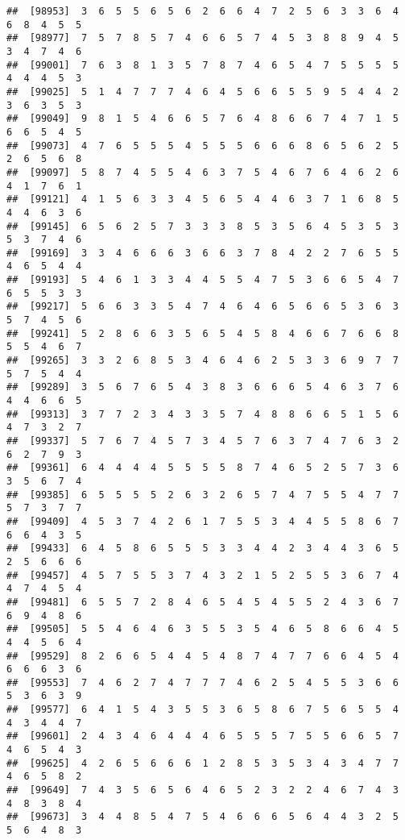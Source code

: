 \documentclass[
]{book}
\begin{document}
\begin{verbatim}
##  [98953]  3  6  5  5  6  5  6  2  6  6  4  7  2  5  6  3  3  6  4  6  8  4  5  5
##  [98977]  7  5  7  8  5  7  4  6  6  5  7  4  5  3  8  8  9  4  5  3  4  7  4  6
##  [99001]  7  6  3  8  1  3  5  7  8  7  4  6  5  4  7  5  5  5  5  4  4  4  5  3
##  [99025]  5  1  4  7  7  7  4  6  4  5  6  6  5  5  9  5  4  4  2  3  6  3  5  3
##  [99049]  9  8  1  5  4  6  6  5  7  6  4  8  6  6  7  4  7  1  5  6  6  5  4  5
##  [99073]  4  7  6  5  5  5  4  5  5  5  6  6  6  8  6  5  6  2  5  2  6  5  6  8
##  [99097]  5  8  7  4  5  5  4  6  3  7  5  4  6  7  6  4  6  2  6  4  1  7  6  1
##  [99121]  4  1  5  6  3  3  4  5  6  5  4  4  6  3  7  1  6  8  5  4  4  6  3  6
##  [99145]  6  5  6  2  5  7  3  3  3  8  5  3  5  6  4  5  3  5  3  5  3  7  4  6
##  [99169]  3  3  4  6  6  6  3  6  6  3  7  8  4  2  2  7  6  5  5  4  6  5  4  4
##  [99193]  5  4  6  1  3  3  4  4  5  5  4  7  5  3  6  6  5  4  7  6  5  5  3  3
##  [99217]  5  6  6  3  3  5  4  7  4  6  4  6  5  6  6  5  3  6  3  5  7  4  5  6
##  [99241]  5  2  8  6  6  3  5  6  5  4  5  8  4  6  6  7  6  6  8  5  5  4  6  7
##  [99265]  3  3  2  6  8  5  3  4  6  4  6  2  5  3  3  6  9  7  7  5  7  5  4  4
##  [99289]  3  5  6  7  6  5  4  3  8  3  6  6  6  5  4  6  3  7  6  4  4  6  6  5
##  [99313]  3  7  7  2  3  4  3  3  5  7  4  8  8  6  6  5  1  5  6  4  7  3  2  7
##  [99337]  5  7  6  7  4  5  7  3  4  5  7  6  3  7  4  7  6  3  2  6  2  7  9  3
##  [99361]  6  4  4  4  4  5  5  5  5  8  7  4  6  5  2  5  7  3  6  3  5  6  7  4
##  [99385]  6  5  5  5  5  2  6  3  2  6  5  7  4  7  5  5  4  7  7  5  7  3  7  7
##  [99409]  4  5  3  7  4  2  6  1  7  5  5  3  4  4  5  5  8  6  7  6  6  4  3  5
##  [99433]  6  4  5  8  6  5  5  5  3  3  4  4  2  3  4  4  3  6  5  2  5  6  6  6
##  [99457]  4  5  7  5  5  3  7  4  3  2  1  5  2  5  5  3  6  7  4  4  7  4  5  4
##  [99481]  6  5  5  7  2  8  4  6  5  4  5  4  5  5  2  4  3  6  7  6  9  4  8  6
##  [99505]  5  5  4  6  4  6  3  5  5  3  5  4  6  5  8  6  6  4  5  4  4  5  6  4
##  [99529]  8  2  6  6  5  4  4  5  4  8  7  4  7  7  6  6  4  5  4  6  6  6  3  6
##  [99553]  7  4  6  2  7  4  7  7  7  4  6  2  5  4  5  5  3  6  6  5  3  6  3  9
##  [99577]  6  4  1  5  4  3  5  5  3  6  5  8  6  7  5  6  5  5  4  4  3  4  4  7
##  [99601]  2  4  3  4  6  4  4  4  6  5  5  5  7  5  5  6  6  5  7  4  6  5  4  3
##  [99625]  4  2  6  5  6  6  6  1  2  8  5  3  5  3  4  3  4  7  7  4  6  5  8  2
##  [99649]  7  4  3  5  6  5  6  4  6  5  2  3  2  2  4  6  7  4  3  4  8  3  8  4
##  [99673]  3  4  4  8  5  4  7  5  4  6  6  6  5  6  4  4  3  2  5  5  6  4  8  3

\end{verbatim}
\end{document}
